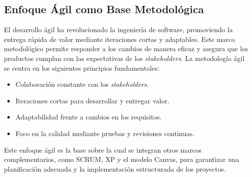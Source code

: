 \documentclass[conference]{IEEEtran}
\begin{document}
\subsection{Enfoque Ágil como Base Metodológica}
El desarrollo ágil ha revolucionado la ingeniería de software, promoviendo la entrega rápida de valor mediante iteraciones cortas y adaptables. Este marco metodológico permite responder a los cambios de manera eficaz y asegura que los productos cumplan con las expectativas de los \textit{stakeholders}. La metodología ágil se centra en los siguientes principios fundamentales:
\begin{itemize}
    \item Colaboración constante con los \textit{stakeholders}.
    \item Iteraciones cortas para desarrollar y entregar valor.
    \item Adaptabilidad frente a cambios en los requisitos.
    \item Foco en la calidad mediante pruebas y revisiones continuas.
\end{itemize}
Este enfoque ágil es la base sobre la cual se integran otros marcos complementarios, como SCRUM, XP y el modelo Canvas, para garantizar una planificación adecuada y la implementación estructurada de los proyectos.\\
\end{document}
